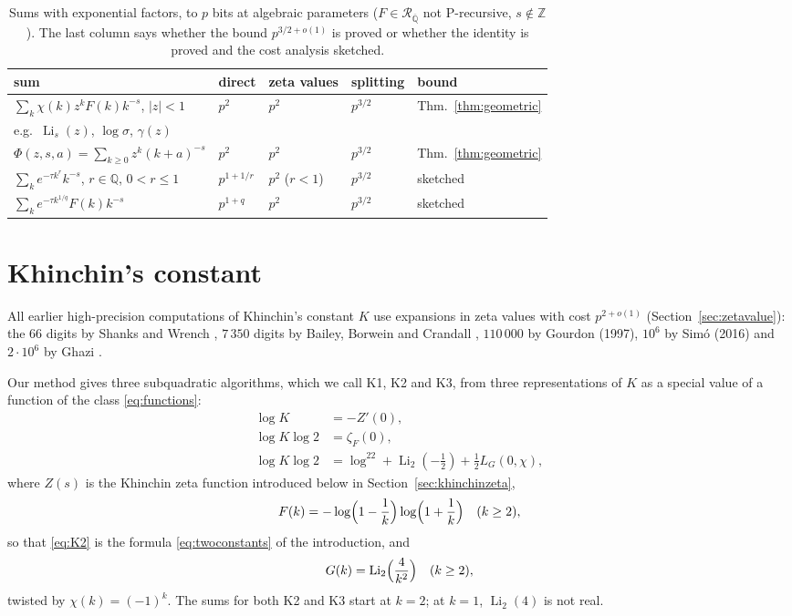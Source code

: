 \documentclass[11pt,reqno]{amsart}
\theoremstyle{definition}
\theoremstyle{remark}
\newcommand{\Li}{\operatorname{Li}}
\newcommand{\QQ}{\mathbb{Q}}
\newcommand{\Qbar}{\overline{\mathbb{Q}}}
\newcommand{\RegQ}{\mathcal{R}_{\Qbar}}
\newcommand{\ZZ}{\mathbb{Z}}
\begin{document}
\begin{table}[ht]
\centering\small
\caption{Sums with exponential factors, to $p$ bits at algebraic parameters ($F \in \RegQ$ not
P-recursive, $s \notin \ZZ$). The last column says whether the bound $p^{3/2+o(1)}$ is proved or whether the identity
is proved and the cost analysis sketched.}
\label{tab:expclass}
\begin{tabular}{lllll}
\toprule
sum & direct & zeta values & splitting & bound \\
\midrule
$\sum_k\chi(k)z^kF(k)k^{-s}$, $|z| < 1$ & $p^{2}$ & $p^{2}$ & $p^{3/2}$ & Thm.~\ref{thm:geometric} \\
\quad e.g.\ $\Li_s(z)$, $\log\sigma$, $\gamma(z)$ & & & & \\
$\Phi(z,s,a) = \sum_{k\ge0}z^k(k+a)^{-s}$ & $p^{2}$ & $p^{2}$ & $p^{3/2}$ & Thm.~\ref{thm:geometric} \\
$\sum_ke^{-\tau k^r}k^{-s}$, $r \in \QQ$, $0 < r \le 1$ & $p^{1+1/r}$ & $p^{2}$ ($r < 1$) & $p^{3/2}$ & sketched \\
$\sum_ke^{-\tau k^{1/q}}F(k)k^{-s}$ & $p^{1+q}$ & $p^{2}$ & $p^{3/2}$ & sketched \\
\bottomrule
\end{tabular}
\end{table}

\section{Khinchin's constant}\label{sec:khinchin}

All earlier high-precision computations of Khinchin's constant $K$ use expansions in zeta values
with cost $p^{2+o(1)}$ (Section~\ref{sec:zetavalue}): the 66 digits by Shanks and
Wrench \cite{SW59}, $7\,350$ digits by Bailey,
Borwein and Crandall \cite{BBC97}, $110\,000$ by Gourdon (1997), $10^6$ by Sim\'o (2016) and $2\cdot10^6$ by Ghazi
\cite{Gha26,MWKdigits}.

Our method gives three subquadratic algorithms, which we call K1, K2 and K3, from
three representations of $K$ as a special value of a function of the class \eqref{eq:functions}:
\begin{align}
  \log K &= -Z'(0), \tag{K1}\label{eq:K1}\\
  \log K\log 2 &= \zeta_F(0), \tag{K2}\label{eq:K2}\\
  \log K\log 2 &= \log^22 + \Li_2(-\tfrac12) + \tfrac12 L_G(0,\chi), \tag{K3}\label{eq:K3}
\end{align}
where $Z(s)$ is the Khinchin zeta function introduced below in Section~\ref{sec:khinchinzeta},
\[
  F(k) = -\log\Bigl(1-\frac1k\Bigr)\log\Bigl(1+\frac1k\Bigr) \quad (k \ge 2),
\]
so that \eqref{eq:K2} is the formula \eqref{eq:twoconstants} of the introduction, and
\[
  G(k) = \Li_2\Bigl(\frac{4}{k^2}\Bigr) \quad (k \ge 2),
\]
twisted by $\chi(k) = (-1)^k$. The sums for both K2 and K3 start at $k = 2$; at $k = 1$, $\Li_2(4)$ is not real.
\end{document}
